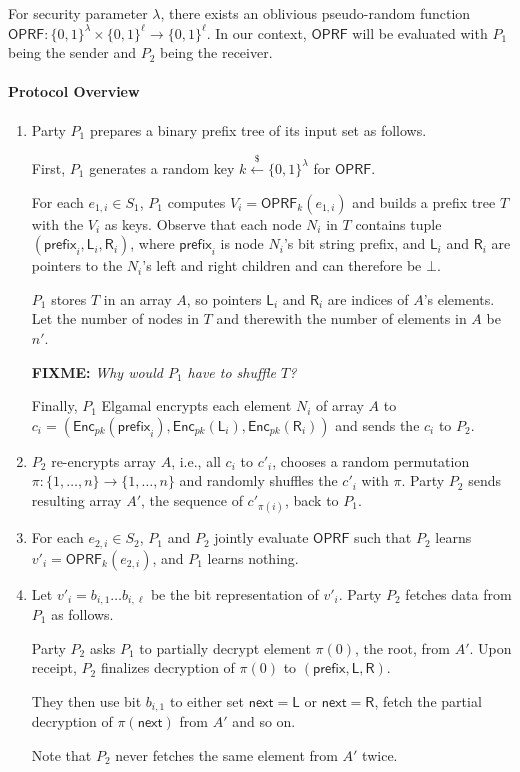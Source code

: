\documentclass{article}
\newcommand{\oprf}[0]{\mathsf{OPRF}}
\newcommand{\getr}[0]{\stackrel{\$}{\leftarrow}}
\newcommand{\enc}[0]{{\mathsf{Enc}}}
\newcommand{\fixme}[1]{{\bf FIXME:} {\emph{#1}}}
\begin{document}
For security parameter $\lambda$, there exists an oblivious
pseudo-random function
$\oprf:\{0,1\}^\lambda\times\{0,1\}^\ell\rightarrow{}\{0,1\}^\ell$.
In our context, $\oprf$ will be evaluated with $P_1$ being the sender
and $P_2$ being the receiver.

\paragraph{Protocol Overview}
\begin{enumerate}[label={\bf Step {\arabic*}:},leftmargin=*]
\item Party $P_1$ prepares a binary prefix tree of its input set as follows.

  First, $P_1$ generates a random key $k\getr\{0,1\}^\lambda$ for $\oprf$.

  For each $e_{1,i}\in{}S_1$, $P_1$ computes $V_i=\oprf_k(e_{1,i})$
  and builds a prefix tree $T$ with the $V_i$ as keys. Observe that
  each node $N_i$ in $T$ contains tuple
  $(\mathsf{prefix}_i,\mathsf{L}_i,\mathsf{R}_i)$, where
  $\mathsf{prefix}_i$ is node $N_i$'s bit string prefix, and
  $\mathsf{L}_i$ and $\mathsf{R}_i$ are pointers to the $N_i$'s left
  and right children and can therefore be $\bot$.

  $P_1$ stores $T$ in an array $A$, so pointers $\mathsf{L}_i$ and
  $\mathsf{R}_i$ are indices of $A$'s elements. Let the number
  of nodes in $T$ and therewith the number of elements in $A$ be
  $n'$.

  \fixme{Why would $P_1$ have to shuffle $T$?}
  
  Finally, $P_1$ Elgamal encrypts each element $N_i$ of array $A$ to
  $c_i=(\enc_{pk}(\mathsf{prefix}_i),\enc_{pk}(\mathsf{L}_i),\enc_{pk}(\mathsf{R}_i))$
  and sends the $c_i$ to $P_2$.

\item $P_2$ re-encrypts array $A$, i.e., all $c_i$ to $c'_i$, chooses
  a random permutation $\pi:\{1,\ldots,n\}\rightarrow\{1,\ldots,n\}$
  and randomly shuffles the $c'_i$ with $\pi$. Party $P_2$ sends
  resulting array $A'$, the sequence of $c'_{\pi(i)}$, back to $P_1$.

\item For each $e_{2,i}\in{}S_2$, $P_1$ and $P_2$ jointly evaluate
  $\oprf$ such that $P_2$ learns $v'_i=\oprf_k(e_{2,i})$, and $P_1$
  learns nothing.

\item Let $v'_i=b_{i,1}\ldots{}b_{i,\ell}$ be the bit representation
  of $v'_i$. Party $P_2$ fetches data from $P_1$ as follows.

  Party $P_2$ asks $P_1$ to partially decrypt element $\pi(0)$, the
  root, from $A'$. Upon receipt, $P_2$ finalizes decryption of
  $\pi(0)$ to $(\mathsf{prefix},\mathsf{L},\mathsf{R})$.

  They then use bit $b_{i,1}$ to either set
  ${\mathsf{next}}=\mathsf{L}$ or ${\mathsf{next}}=\mathsf{R}$, fetch
  the partial decryption of $\pi({\mathsf{next}})$ from $A'$ and so on.

  Note that $P_2$ never fetches the same element from $A'$ twice. 
  
\end{enumerate}
\end{document}

